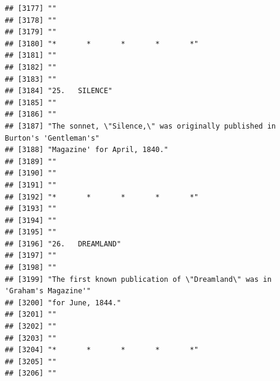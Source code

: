 \documentclass{article}\usepackage[]{graphicx}\usepackage[]{color}
\makeatletter
\newenvironment{kframe}{%
 \def\at@end@of@kframe{}%
 \ifinner\ifhmode%
  \def\at@end@of@kframe{\end{minipage}}%
  \begin{minipage}{\columnwidth}%
 \fi\fi%
 \def\FrameCommand##1{\hskip\@totalleftmargin \hskip-\fboxsep
 \colorbox{shadecolor}{##1}\hskip-\fboxsep
     \hskip-\linewidth \hskip-\@totalleftmargin \hskip\columnwidth}%
 \MakeFramed {\advance\hsize-\width
   \@totalleftmargin\z@ \linewidth\hsize
   \@setminipage}}%
 {\par\unskip\endMakeFramed%
 \at@end@of@kframe}
\newenvironment{knitrout}{}{} %
\makeatother
\begin{document}
\begin{knitrout}
\begin{kframe}
\begin{verbatim}
## [3177] ""                                                                            
## [3178] ""                                                                            
## [3179] ""                                                                            
## [3180] "*       *       *       *       *"                                           
## [3181] ""                                                                            
## [3182] ""                                                                            
## [3183] ""                                                                            
## [3184] "25.   SILENCE"                                                               
## [3185] ""                                                                            
## [3186] ""                                                                            
## [3187] "The sonnet, \"Silence,\" was originally published in Burton's 'Gentleman's"  
## [3188] "Magazine' for April, 1840."                                                  
## [3189] ""                                                                            
## [3190] ""                                                                            
## [3191] ""                                                                            
## [3192] "*       *       *       *       *"                                           
## [3193] ""                                                                            
## [3194] ""                                                                            
## [3195] ""                                                                            
## [3196] "26.   DREAMLAND"                                                             
## [3197] ""                                                                            
## [3198] ""                                                                            
## [3199] "The first known publication of \"Dreamland\" was in 'Graham's Magazine'"     
## [3200] "for June, 1844."                                                             
## [3201] ""                                                                            
## [3202] ""                                                                            
## [3203] ""                                                                            
## [3204] "*       *       *       *       *"                                           
## [3205] ""                                                                            
## [3206] ""                                                                            

\end{verbatim}
\end{kframe}
\end{knitrout}
\end{document}
